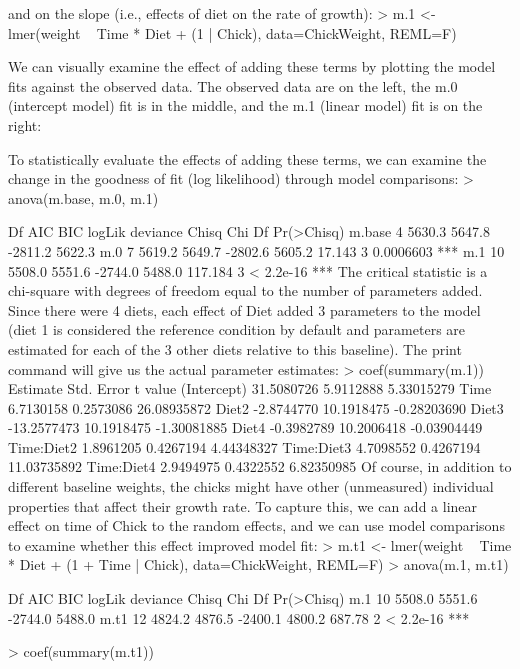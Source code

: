 and on the slope (i.e., effects of diet on the rate of growth):
> m.1 <- lmer(weight ~ Time * Diet + (1 | Chick), data=ChickWeight, REML=F)

We can visually examine the effect of adding these terms by plotting the model fits against the observed data. The observed data are on the left, the m.0 (intercept model) fit is in the middle, and the m.1 (linear model) fit is on the right:


To statistically evaluate the effects of adding these terms, we can examine the change in the goodness of fit (log likelihood) through model comparisons:
> anova(m.base, m.0, m.1)

       Df    AIC    BIC  logLik deviance   Chisq Chi Df Pr(>Chisq)    
m.base  4 5630.3 5647.8 -2811.2   5622.3                              
m.0     7 5619.2 5649.7 -2802.6   5605.2  17.143      3  0.0006603 ***
m.1    10 5508.0 5551.6 -2744.0   5488.0 117.184      3  < 2.2e-16 ***
The critical statistic is a chi-square with degrees of freedom equal to the number of parameters added. Since there were 4 diets, each effect of Diet added 3 parameters to the model (diet 1 is considered the reference condition by default and parameters are estimated for each of the 3 other diets relative to this baseline). The print command will give us the actual parameter estimates:
 > coef(summary(m.1))
               Estimate Std. Error     t value
(Intercept)  31.5080726  5.9112888  5.33015279
Time          6.7130158  0.2573086 26.08935872
Diet2        -2.8744770 10.1918475 -0.28203690
Diet3       -13.2577473 10.1918475 -1.30081885
Diet4        -0.3982789 10.2006418 -0.03904449
Time:Diet2    1.8961205  0.4267194  4.44348327
Time:Diet3    4.7098552  0.4267194 11.03735892
Time:Diet4    2.9494975  0.4322552  6.82350985
Of course, in addition to different baseline weights, the chicks might have other (unmeasured) individual properties that affect their growth rate. To capture this, we can add a linear effect on time of Chick to the random effects, and we can use model comparisons to examine whether this effect improved model fit:
> m.t1 <- lmer(weight ~ Time * Diet + (1 + Time | Chick), data=ChickWeight, REML=F)
> anova(m.1, m.t1)

     Df    AIC    BIC  logLik deviance  Chisq Chi Df Pr(>Chisq)    
m.1  10 5508.0 5551.6 -2744.0   5488.0                             
m.t1 12 4824.2 4876.5 -2400.1   4800.2 687.78      2  < 2.2e-16 ***

> coef(summary(m.t1))

